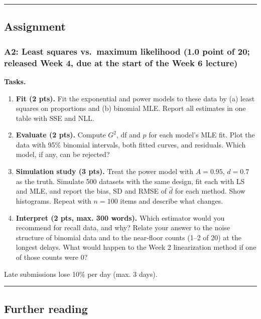 \begin{center}\rule{0.5\linewidth}{0.5pt}\end{center}


\subsection{Assignment}

\subsubsection{A2: Least squares vs.~maximum likelihood (1.0 point of
20; released Week 4, due at the start of the Week 6 lecture)}

\textbf{Tasks.}

\begin{enumerate}
\def\labelenumi{\arabic{enumi}.}
\tightlist
\item
  \textbf{Fit (2 pts).} Fit the exponential and power models to these
  data by (a) least squares on proportions and (b) binomial MLE. Report
  all estimates in one table with SSE and NLL.
\item
  \textbf{Evaluate (2 pts).} Compute \(G^2\), df and \(p\) for each
  model's MLE fit. Plot the data with 95\% binomial intervals, both
  fitted curves, and residuals. Which model, if any, can be rejected?
\item
  \textbf{Simulation study (3 pts).} Treat the power model with
  \(A = 0.95\), \(d = 0.7\) as the truth. Simulate 500 datasets with the
  same design, fit each with LS and MLE, and report the bias, SD and
  RMSE of \(\hat d\) for each method. Show histograms. Repeat with
  \(n = 100\) items and describe what changes.
\item
  \textbf{Interpret (2 pts, max. 300 words).} Which estimator would you
  recommend for recall data, and why? Relate your answer to the noise
  structure of binomial data and to the near-floor counts (1--2 of 20)
  at the longest delays. What would happen to the Week 2 linearization
  method if one of those counts were 0?
\end{enumerate}

Late submissions lose 10\% per day (max. 3 days).

\begin{center}\rule{0.5\linewidth}{0.5pt}\end{center}

\subsection{Further reading}

